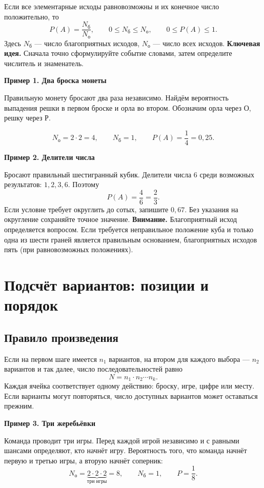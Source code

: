 \documentclass[a4paper,12pt]{article}
\newcommand{\idea}[1]{\textcolor{darkaccent}{\textbf{Ключевая идея.}} #1}
\newcommand{\example}[1]{\par\medskip\textcolor{darkaccent}{\textbf{#1}}\par}
\newcommand{\warning}[1]{\textcolor{warn}{\textbf{Внимание.}} #1}
\newcommand{\nb}{N_{\text{б}}}
\newcommand{\Nall}{N_{\text{о}}}
\begin{document}
Если все элементарные исходы равновозможны и их конечное число положительно, то
\[ P(A)=\frac{\nb}{\Nall},\qquad 0\le \nb\le \Nall,\qquad 0\le P(A)\le 1. \]
Здесь $\nb$ --- число благоприятных исходов, $\Nall$ --- число всех исходов.
\idea{Сначала точно сформулируйте событие словами, затем определите числитель и знаменатель.}
\example{Пример 1. Два броска монеты}
Правильную монету бросают два раза независимо. Найдём вероятность выпадения решки в первом броске и орла во втором. Обозначим орла через О, решку через Р.
\begin{center}
\end{center}
\[ \Nall=2\cdot2=4,\qquad \nb=1,\qquad P(A)=\frac14=0,25. \]
\example{Пример 2. Делители числа}
Бросают правильный шестигранный кубик. Делители числа 6 среди возможных результатов: $1,2,3,6$. Поэтому
\[ P(A)=\frac46=\frac23. \]
Если условие требует округлить до сотых, запишите $0,67$. Без указания на округление сохраняйте точное значение.
\warning{Благоприятный исход определяется вопросом. Если требуется неправильное положение куба и только одна из шести граней является правильным основанием, благоприятных исходов пять (при равновозможных положениях).}

\clearpage
\section{Подсчёт вариантов: позиции и порядок}
\subsection*{Правило произведения}
Если на первом шаге имеется $n_1$ вариантов, на втором для каждого выбора --- $n_2$ вариантов и так далее, число последовательностей равно
\[ N=n_1\cdot n_2\cdots n_k. \]
Каждая ячейка соответствует одному действию: броску, игре, цифре или месту. Если варианты могут повторяться, число доступных вариантов может оставаться прежним.
\example{Пример 3. Три жеребьёвки}
Команда проводит три игры. Перед каждой игрой независимо и с равными шансами определяют, кто начнёт игру. Вероятность того, что команда начнёт первую и третью игры, а вторую начнёт соперник:
\[ \Nall=\underbrace{2\cdot2\cdot2}_{\text{три игры}}=8,\qquad \nb=1,\qquad P=\frac18. \]
\end{document}
